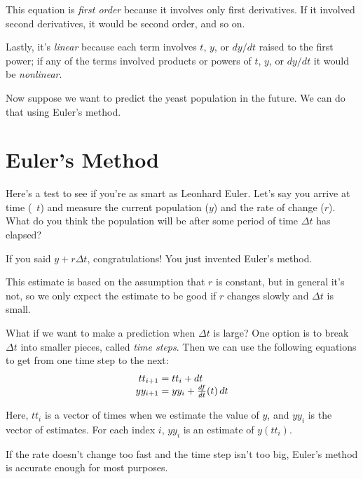 \documentclass[../../book.tex]{subfiles}
\begin{document}

This equation is \emph{first order} because it involves only first
derivatives.  If it involved second derivatives, it would be second order,
and so on.


Lastly, it's \emph{linear} because each term involves $t$, $y$, or
$dy/dt$ raised to the first power; if any of the terms involved
products or powers of $t$, $y$, or $dy/dt$ it would be
\emph{nonlinear}.

Now suppose we want to predict the yeast population in the future.  We can do that using Euler's method.

\section{Euler's Method}

Here's a test to see if you're as smart as Leonhard Euler.  Let's say you arrive at time (~$t$) and measure the current population ($y$) and
the rate of change ($r$).  What do you think the population will
be after some period of time $\Delta t$  has elapsed?

If you said $y + r \Delta t$, congratulations!  You just invented
Euler's method.


This estimate is based on the assumption that $r$ is constant, but in general it's not, so we only expect the estimate to be good if $r$ changes slowly and $\Delta t$ is small.

What if we want to make a prediction when $\Delta t$ is large?
One option is to break $\Delta t$ into smaller pieces, called
\emph{time steps}. Then we can use the following equations to get from one time step to the next:
\begin{equation}
    \label{e:euler}
    \begin{array}{r@{}l}
        tt_{i+1} &{}= tt_i + dt   \\
        yy_{i+1} &{}= yy_i + \frac{df}{dt}(t) \, dt        
    \end{array}
\end{equation}

Here, $tt_i$ is a vector of times when we estimate the value of $y$, and $yy_i$ is the vector of estimates.
For each index $i$, $yy_i$ is an estimate of $y(tt_i)$.


If the rate doesn't change too fast and the time step isn't
too big, Euler's method is accurate enough for most purposes.
\end{document}

